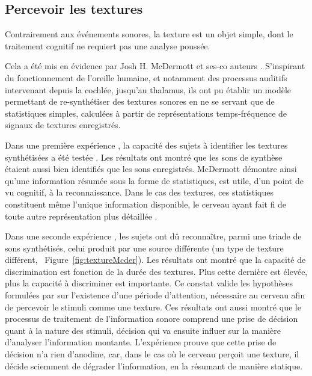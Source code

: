 \subsection{Percevoir les textures}

Contrairement aux événements sonores, la texture est un objet simple, dont le traitement cognitif ne requiert pas une analyse poussée. 

Cela a été mis en évidence par Josh H. McDermott et ses-co auteurs \citep{mcdermott2011sound,mcdermott2013summary}. S'inspirant du fonctionnement de l'oreille humaine, et notamment des processus auditifs intervenant depuis la cochlée, jusqu'au thalamus, ils ont pu établir un modèle permettant de re-synthétiser des textures sonores en ne se servant que de statistiques simples, calculées à partir de représentations temps-fréquence de signaux de textures enregistrés. 

Dans une première expérience \citep{mcdermott2011sound}, la capacité des sujets à identifier les textures synthétisées a été testée . Les résultats ont montré que les sons de synthèse étaient aussi bien identifiés que les sons enregistrés. McDermott démontre ainsi qu'une information résumée sous la forme de statistiques, est utile, d'un point de vu cognitif, à la reconnaissance. Dans le cas des textures, ces statistiques constituent même l'unique information disponible, le cerveau ayant fait fi de toute autre représentation plus détaillée \citep{nelken2013ear}.

Dans une seconde expérience \citep{mcdermott2013summary}, les sujets ont dû reconnaître, parmi une triade de sons synthétisés, celui produit par une source différente (\ie un type de texture différent, \cf~Figure~\ref{fig:textureMcder}). Les résultats ont montré que la capacité de discrimination est fonction de la durée des textures. Plus cette dernière est élevée, plus la capacité à discriminer est importante. Ce constat valide les hypothèses formulées par \citep{saint1995classification} sur l'existence d'une période d'attention, nécessaire au cerveau afin de percevoir le stimuli comme une texture. Ces résultats ont aussi montré que le processus de traitement de l'information sonore comprend une prise de décision quant à la nature des stimuli, décision qui va  ensuite influer sur la manière d'analyser l'information montante. L'expérience prouve que cette prise de décision n'a rien d'anodine, car, dans le cas où le cerveau perçoit une texture, il décide sciemment de dégrader l'information, en la résumant de manière statique.

